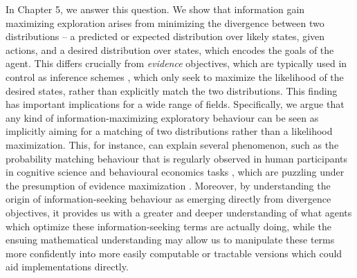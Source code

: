 In Chapter 5, we answer this question. We show that information gain maximizing exploration arises from minimizing the divergence between two distributions -- a predicted or expected distribution over likely states, given actions, and a desired distribution over states, which encodes the goals of the agent. This differs crucially from \emph{evidence} objectives, which are typically used in control as inference schemes \citep{levine2018reinforcement,rawlik2013stochastic}, which only seek to maximize the likelihood of the desired states, rather than explicitly match the two distributions. This finding has important implications for a wide range of fields. Specifically, we argue that any kind of information-maximizing exploratory behaviour can be seen as implicitly aiming for a matching of two distributions rather than a likelihood maximization. This, for instance, can explain several phenomenon, such as the probability matching behaviour that is regularly observed in human participants in cognitive science and behavioural economics tasks \citep{vulkan2000economist,daw2006cortical,west2003probability,shanks2002re}, which are puzzling under the presumption of evidence maximization \citep{tversky1974judgment,gaissmaier2008smart}. Moreover, by understanding the origin of information-seeking behaviour as emerging directly from divergence objectives, it provides us with a greater and deeper understanding of what agents which optimize these information-seeking terms are actually doing, while the ensuing mathematical understanding may allow us to manipulate these terms more confidently into more easily computable or tractable versions which could aid implementations directly.

